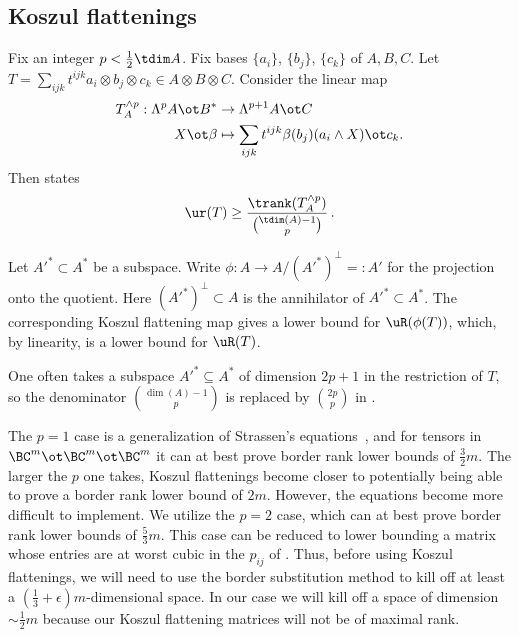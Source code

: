 \documentclass{toc}
\begin{document}
\subsection{Koszul flattenings}\label{subsec: generalized flattenings}
Fix an integer $p<\frac 12 \tdim A$.
Fix bases $\{a_i\}$, $\{b_j\}$, $\{ c_k\}$ of   $A,B,C$. Let  
$T = \sum_{ijk} t^{ijk} a_i \otimes b_j \otimes c_k \in A \otimes B \otimes C$. Consider the linear map
\begin{align*}
T_A^{\wedge p}: \Lambda^p A \ot B^* &\to \Lambda^{p+1}A\ot C \\
X\ot \beta & \mapsto \sum_{ijk}t^{ijk}\beta(b_j)(a_i\wedge X) \ot c_k.
\end{align*}
Then  \cite[Proposition 4.1.1]{MR3081636} states 
\begin{equation}\label{kozinq}
\ur(T)\geq \frac{\trank(T_{A}^{\wedge p})}{\binom {\tdim(A)-1}p}\,.
\end{equation}

Let ${A'}^*\subset A^*$ be a subspace. Write $\phi : A \to A/ 
({A'}^*)^\perp=:A'$ for the projection onto the quotient.
Here $({A'}^*)^\perp\subset A$ is the annihilator of ${A'}^*\subset A^*$.
The corresponding Koszul 
flattening map gives a lower bound for $\uR(\phi(T))$, which, by linearity, is 
a lower bound for $\uR(T)$.

One often  takes a subspace ${A'}^*\subseteq A^*$ of dimension $2p+1$ in the restriction of
  $T$, so the denominator $\binom{\dim(A)-1}{p}$ is 
replaced by $\binom{2p}{p}$ in .  

The $p=1$ case is a generalization of  Strassen's equations~\cite{Strassen505}, and
for tensors in 
$\BC^m\ot \BC^m\ot \BC^m$ it  can at best prove border rank lower bounds of $\frac 32m$.
 The larger the $p$ one takes, Koszul flattenings become  closer to potentially being
 able to prove a border rank lower bound
 of $2m$. However, the equations become more difficult to implement.
We  utilize the $p=2$ case, which 
can at best prove border rank lower bounds of $\frac 53m$. This case can be reduced
to lower bounding a matrix whose entries are at worst cubic in the $p_{ij}$ of
.  %
Thus,  before using Koszul flattenings, 
 we will need to use the border substitution method to kill off  at least a 
$(\frac 13+\epsilon)m$-dimensional space.
In our case  we will  kill off  a space of dimension  
$\sim\frac{1}{2}m$ because our Koszul flattening matrices will not be of maximal rank.

\newcommand{\qz}{\hspace{-0.05em}}    %
%
    
\end{document}
